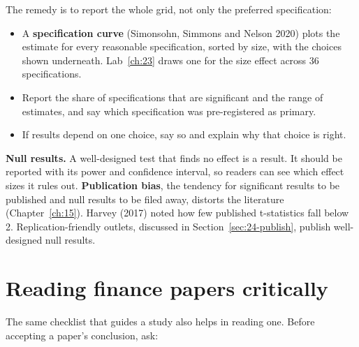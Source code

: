 The remedy is to report the whole grid, not only the preferred specification:

\begin{itemize}
  \item A \textbf{specification curve} (Simonsohn, Simmons and Nelson 2020) plots the estimate for every reasonable specification, sorted by size, with the choices shown underneath. Lab~\ref{ch:23} draws one for the size effect across 36 specifications.
  \item Report the share of specifications that are significant and the range of estimates, and say which specification was pre-registered as primary.
  \item If results depend on one choice, say so and explain why that choice is right.
\end{itemize}

\textbf{Null results.} A well-designed test that finds no effect is a result. It should be reported with its power and confidence interval, so readers can see which effect sizes it rules out. \textbf{Publication bias}, the tendency for significant results to be published and null results to be filed away, distorts the literature (Chapter~\ref{ch:15}). Harvey (2017) noted how few published t-statistics fall below 2. Replication-friendly outlets, discussed in Section~\ref{sec:24-publish}, publish well-designed null results.

\section{Reading finance papers critically}
\label{sec:24-reading}

The same checklist that guides a study also helps in reading one. Before accepting a paper's conclusion, ask:


